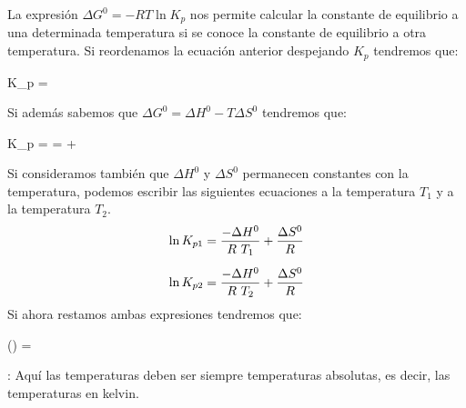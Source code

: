 \setcounter{ejemplo}{0}
La expresión \(\Delta G^0 = - RT\ln K_p\) nos permite calcular la constante de equilibrio a una determinada temperatura si se conoce la constante de equilibrio a otra temperatura.
Si reordenamos la ecuación anterior despejando \(K_p\) tendremos que:
\begin{centeredequation}
    \ln K_p = 
\end{centeredequation}
Si además sabemos que \(\Delta G^0 = \Delta H^0 - T\Delta S^0\) tendremos que:
\begin{centeredequation}
    \ln K_p =  =  + 
\end{centeredequation}
Si consideramos también que \(\Delta H^0\) y \(\Delta S^0\) permanecen constantes con la temperatura, podemos escribir las siguientes ecuaciones a la temperatura \(T_1\) y a la temperatura \(T_2\).
\begin{gather*}
    \ln K_{p1} =  \dfrac{-\Delta H^0}{R\ T_1} + \dfrac{\Delta S^0}{R}\separ
    \ln K_{p2} =  \dfrac{-\Delta H^0}{R\ T_2} + \dfrac{\Delta S^0}{R}
\end{gather*}
Si ahora restamos ambas expresiones tendremos que:
\begin{centeredequation}
    \ln\left(\right) =   \label{eq:relacion-kp-temperatura}
\end{centeredequation}
: Aquí las temperaturas deben ser siempre temperaturas absolutas, es decir, las temperaturas en kelvin.
%
%
%
%


